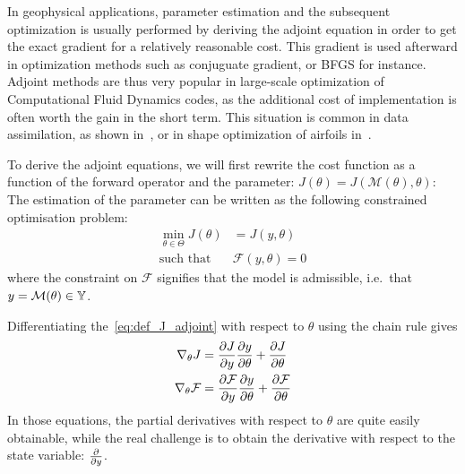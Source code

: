 \documentclass[../../Main_ManuscritThese.tex]{subfiles}
\begin{document}
In geophysical applications, parameter estimation and the subsequent optimization is usually performed by deriving the adjoint equation in order to get the exact gradient for a relatively reasonable cost. This gradient is used afterward in optimization methods such as conjuguate gradient, or BFGS for instance. Adjoint methods are thus very popular in large-scale optimization of Computational Fluid Dynamics codes, as the additional cost of implementation is often worth the gain in the short term. This situation is common in data assimilation, as shown in~\cite{das_estimation_1991,das_variational_1992,honnorat_identification_2010,couderc_dassfow-shallow_2013}, or in shape optimization of airfoils in~\cite{huyse_free-form_2001}.

To derive the adjoint equations, we will first rewrite the cost function as a function of the forward operator and the parameter: $J(\theta) = J(\mathcal{M}(\theta),\theta)$:
The estimation of the parameter can be written as the following constrained optimisation problem:
\begin{equation}
  \begin{aligned}
  \min_{\theta \in \Theta} J(\theta) &= J(y, \theta) \label{eq:def_J_adjoint} \\
  \text{such that } &\mathcal{F}(y, \theta) = 0 %
  \end{aligned}
\end{equation}
where the constraint on $\mathcal{F}$ signifies that the model is admissible, i.e.\ that $y = \mathcal{M}(\theta)\in \mathbb{Y}$.

 Differentiating the~\cref{eq:def_J_adjoint} with respect to $\theta$ using the chain rule gives
\begin{equation}
  \begin{aligned}
  \nabla_\theta J &= \frac{\partial J}{\partial y} \frac{\partial y}{\partial \theta} + \frac{\partial J}{\partial \theta}\\
    \nabla_\theta \mathcal{F} &= \frac{\partial \mathcal{F}}{\partial y} \frac{\partial y}{\partial \theta} + \frac{\partial \mathcal{F}}{\partial \theta}
  \end{aligned} \label{eq:aze}
\end{equation}
In those equations, the partial derivatives with respect to $\theta$ are quite easily obtainable, while the real challenge is to obtain the derivative with respect to the state variable: $\frac{\partial }{\partial y}$.
\end{document}
